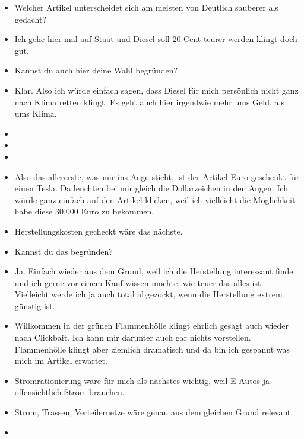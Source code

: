 {\begin{itemize}[]
        \item {} Welcher Artikel unterscheidet sich am meisten von \flqq Deutlich sauberer als gedacht\frqq{}?
        \item {} Ich gehe hier mal auf Staat und \flqq Diesel soll 20 Cent teurer werden\frqq{} klingt doch gut.
        \item {} Kannst du auch hier deine Wahl begründen?
        \item {} Klar. Also ich würde einfach sagen, dass Diesel für mich persönlich nicht ganz nach Klima retten klingt.
              Es geht auch hier irgendwie mehr ums Geld, als ums Klima.
        \item {}
        \item {}
        \item {}
        \item {} Also das allererste, was mir ins Auge sticht, ist der Artikel  Euro geschenkt für einen Tesla\frqq{}.
              Da leuchten bei mir gleich die Dollarzeichen in den Augen.
              Ich würde ganz einfach auf den Artikel klicken, weil ich vielleicht die Möglichkeit habe diese 30.000 Euro zu bekommen.
        \item {} \flqq Herstellungskosten gecheckt\frqq{} wäre das nächste.
        \item {} Kannst du das begründen?
        \item {} Ja. Einfach wieder aus dem Grund, weil ich die Herstellung interessant finde und ich gerne vor einem Kauf wissen möchte, wie teuer das alles ist.
              Vielleicht werde ich ja auch total abgezockt, wenn die Herstellung extrem günstig ist.
        \item {} \flqq Willkommen in der grünen Flammenhölle\frqq{} klingt ehrlich gesagt auch wieder nach Clickbait.
              Ich kann mir darunter auch gar nichts vorstellen.
              Flammenhölle klingt aber ziemlich dramatisch und da bin ich gespannt was mich im Artikel erwartet.
        \item {} \flqq Stromrationierung\frqq{} wäre für mich als nächstes wichtig, weil E-Autos ja offensichtlich Strom brauchen.
        \item {} \flqq Strom, Trassen, Verteilernetze\frqq{} wäre genau aus dem gleichen Grund relevant.
        \item {}

\end{itemize}}
